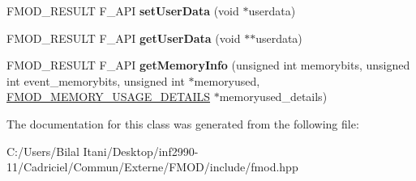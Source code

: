 \begin{DoxyCompactItemize}
\item 
F\+M\+O\+D\+\_\+\+R\+E\+S\+U\+LT F\+\_\+\+A\+PI {\bfseries set\+User\+Data} (void $\ast$userdata)\hypertarget{class_f_m_o_d_1_1_d_s_p_connection_ab3d3a0dc61be71656ee5b1b5d7dab50d}{}\label{class_f_m_o_d_1_1_d_s_p_connection_ab3d3a0dc61be71656ee5b1b5d7dab50d}

\item 
F\+M\+O\+D\+\_\+\+R\+E\+S\+U\+LT F\+\_\+\+A\+PI {\bfseries get\+User\+Data} (void $\ast$$\ast$userdata)\hypertarget{class_f_m_o_d_1_1_d_s_p_connection_ad9db81fe98ee0eecb099a565d5ae2a4d}{}\label{class_f_m_o_d_1_1_d_s_p_connection_ad9db81fe98ee0eecb099a565d5ae2a4d}

\item 
F\+M\+O\+D\+\_\+\+R\+E\+S\+U\+LT F\+\_\+\+A\+PI {\bfseries get\+Memory\+Info} (unsigned int memorybits, unsigned int event\+\_\+memorybits, unsigned int $\ast$memoryused, \hyperlink{struct_f_m_o_d___m_e_m_o_r_y___u_s_a_g_e___d_e_t_a_i_l_s}{F\+M\+O\+D\+\_\+\+M\+E\+M\+O\+R\+Y\+\_\+\+U\+S\+A\+G\+E\+\_\+\+D\+E\+T\+A\+I\+LS} $\ast$memoryused\+\_\+details)\hypertarget{class_f_m_o_d_1_1_d_s_p_connection_aaaf64c05107a635984495b8f4ba8a8fd}{}\label{class_f_m_o_d_1_1_d_s_p_connection_aaaf64c05107a635984495b8f4ba8a8fd}

\end{DoxyCompactItemize}


The documentation for this class was generated from the following file\+:\begin{DoxyCompactItemize}
\item 
C\+:/\+Users/\+Bilal Itani/\+Desktop/inf2990-\/11/\+Cadriciel/\+Commun/\+Externe/\+F\+M\+O\+D/include/fmod.\+hpp\end{DoxyCompactItemize}
